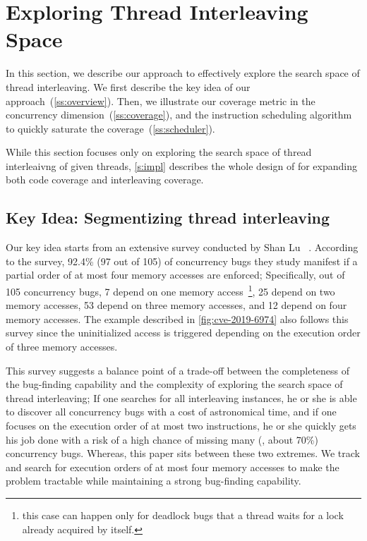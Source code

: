\section{Exploring Thread Interleaving Space}
\label{s:design}


In this section, we describe our approach to effectively explore the
search space of thread interleaving.
%
We first describe the key idea of our
approach~(\autoref{ss:overview}). Then, we illustrate our coverage
metric in the concurrency dimension~(\autoref{ss:coverage}), and the
instruction scheduling algorithm to quickly saturate the
coverage~(\autoref{ss:scheduler}).



While this section focuses only on exploring the search space of
thread interleaivng of given threads, \autoref{s:impl} describes the
whole design of \sys for expanding both code coverage and interleaving
coverage.


\subsection{Key Idea: Segmentizing thread interleaving}
\label{ss:overview}


Our key idea starts from an extensive survey conducted by Shan Lu
\etal~\cite{learningfrommistakes}.
%
According to the survey, 92.4\% (97 out of 105) of concurrency bugs
they study manifest if a partial order of at most four memory accesses
are enforced;
%
Specifically, out of 105 concurrency bugs, 7 depend on one memory
access~\footnote{this case can happen only for deadlock bugs that a
  thread waits for a lock already acquired by itself.}, 25 depend on
two memory accesses, 53 depend on three memory accesses, and 12 depend
on four memory accesses.
%
The example described in \autoref{fig:cve-2019-6974} also follows this
survey since the uninitialized access is triggered depending on the
execution order of three memory accesses.


This survey suggests a balance point of a trade-off between the
completeness of the bug-finding capability and the complexity of
exploring the search space of thread interleaving;
%
If one searches for all interleaving instances, he or she is able to
discover all concurrency bugs with a cost of astronomical time, and
if one focuses on the execution order of at most two instructions, he
or she quickly gets his job done with a risk of a high chance of
missing many (\eg, about 70\%) concurrency bugs.
%
Whereas, this paper sits between these two extremes. We track and
search for execution orders of at most four memory accesses to make
the problem tractable while maintaining a strong bug-finding
capability.



